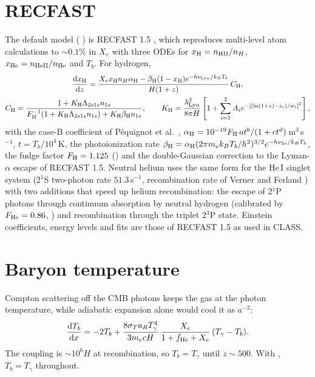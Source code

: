 \section{RECFAST}

The default model ( ) is RECFAST 1.5
\cite{Seager1999,Wong2008,RubinoMartin2010}, which reproduces multi-level atom calculations to $\sim0.1\%$ in $X_e$
with three ODEs for $x_{\rm H}=n_{\rm HII}/n_H$, $x_{\rm He}=n_{\rm HeII}/n_{\rm He}$ and $T_b$. For hydrogen,
\begin{gather}
\frac{\mathrm{d} x_{\rm H}}{\mathrm{d} z}=\frac{X_ex_{\rm H}n_H\alpha_{\rm H}-\beta_{\rm H}(1-x_{\rm H})e^{-h\nu_{{\rm Ly}\alpha}/k_BT_b}}{H(1+z)}\,C_{\rm H},\\
C_{\rm H}=\frac{1+K_{\rm H}\Lambda_{2s1s}n_{1s}}{F_{\rm H}^{-1}(1+K_{\rm H}\Lambda_{2s1s}n_{1s})+K_{\rm H}\beta_{\rm H}n_{1s}},\qquad
K_{\rm H}=\frac{\lambda_{{\rm Ly}\alpha}^3}{8\pi H}\left[1+\sum_{i=1}^2A_ie^{-[(\ln(1+z)-z_i)/w_i]^2}\right],
\end{gather}
with the case-B coefficient of P\'equignot et al.\ \cite{Pequignot1991},
$\alpha_{\rm H}=10^{-19}F_{\rm H}\,at^b/(1+ct^d)$\,m$^3$\,s$^{-1}$, $t=T_b/10^4$\,K, the photoionization rate
$\beta_{\rm H}=\alpha_{\rm H}(2\pi m_ek_BT_b/h^2)^{3/2}e^{-h\nu_{2s}/k_BT_b}$, the fudge factor
$F_{\rm H}=1.125$ () and the double-Gaussian correction to the Lyman-$\alpha$ escape of
RECFAST 1.5. Neutral helium uses the same form for the He\,I singlet system (2$^1$S two-photon rate $51.3$\,s$^{-1}$,
recombination rate of Verner and Ferland \cite{Verner1996}) with two additions that speed up helium recombination:
the escape of 2$^1$P photons through continuum absorption by neutral hydrogen (calibrated by $F_{\rm He}=0.86$,
) and recombination through the triplet 2$^3$P state. Einstein coefficients, energy
levels and fits are those of RECFAST 1.5 as used in CLASS.

\section{Baryon temperature}

Compton scattering off the CMB photons keeps the gas at the photon temperature, while adiabatic expansion alone
would cool it as $a^{-2}$:
\begin{equation}
\frac{\mathrm{d} T_b}{\mathrm{d} x}=-2T_b+\frac{8\sigma_Ta_RT_\gamma^4}{3m_ecH}\,\frac{X_e}{1+f_{\rm He}+X_e}\,(T_\gamma-T_b).
\end{equation}
The coupling is $\sim10^6H$ at recombination, so $T_b=T_\gamma$ until $z\sim500$. With
 , $T_b=T_\gamma$ throughout.

